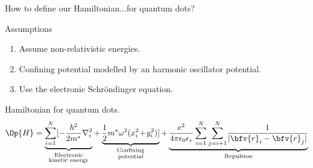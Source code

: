 


\begin{frame}{How to define our Hamiltonian...for quantum dots?}
  \begin{scriptsize}
  \begin{alertblock}{Assumptions}
    \begin{enumerate}
    
      \item Assume non-relativistic energies.
      
      \item Confining potential modelled by an harmonic oscillator potential.
        
      \item Use the electronic Schr\"ondinger equation.
    \end{enumerate}
  \end{alertblock}
  
  \begin{alertblock}{Hamiltonian for quantum dots.}
    \centering
    $$\Op{H} =\underbrace{\sum_{i=1}^{N}[-\frac{\hbar^2}{2m^*}\nabla^{2}_{i}}_{\begin{smallmatrix}\text{Electronic}\\\text{kinetic energy}\end{smallmatrix}}          
         +\underbrace{\frac{1}{2} m^*\omega^{2}(x_{i}^{2}\!+\!y_{i}^{2})]}_{\begin{smallmatrix}\text{Confining}\\\text{potential}\end{smallmatrix}} + \underbrace{\frac{e^2}{4\pi\epsilon_0\epsilon_r}\sum_{i=1}^{N}\sum_{j=i+1}^{N}\!\frac{1}{|\bfv{r}_i - \bfv{r}_j|}}_{\text{Repulsion}}
        $$
      \end{alertblock}
  \end{scriptsize}
\end{frame}



